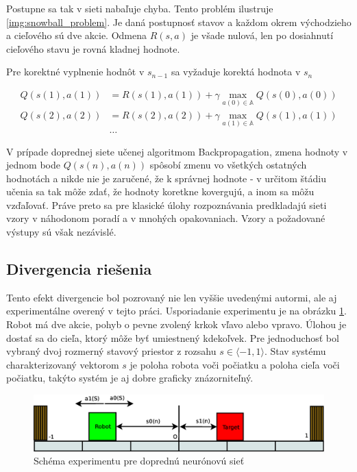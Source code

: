 Postupne sa tak v sieti nabaľuje chyba. Tento problém ilustruje \ref{img:snowball_problem}.
Je daná postupnosť stavov a každom okrem východzieho a cieľového sú dve akcie.
Odmena $R(s,a)$ je všade nulová, len po dosiahnutí cieľového stavu je rovná kladnej hodnote.

Pre korektné vyplnenie hodnôt v $s_{n-1}$ sa vyžaduje korektá hodnota v $s_{n}$

\begin{align*}
    Q(s(1),a(1)) &= R(s(1),a(1)) + \gamma \max_{a(0) \in \mathbb{A}} Q(s(0), a(0)) \\
    Q(s(2),a(2)) &= R(s(2),a(2)) + \gamma \max_{a(1) \in \mathbb{A}} Q(s(1), a(1)) \\
    & \dots
\end{align*}

V prípade doprednej siete učenej algoritmom Backpropagation, zmena hodnoty v jednom bode $Q(s(n),a(n))$ spôsobí
zmenu vo všetkých ostatných hodnotách a nikde nie je zaručené, že k správnej hodnote -
v určitom štádiu učenia sa tak môže zdať, že hodnoty koretkne kovergujú, a inom
sa môžu vzďaľovať. Práve preto sa pre klasické úlohy rozpoznávania predkladajú sieti vzory
v náhodonom poradí a v mnohých opakovaniach. Vzory a požadované výstupy sú však nezávislé.

\subsection{Divergencia riešenia}

Tento efekt divergencie bol pozrovaný nie len vyššie uvedenými autormi, ale aj experimentálne
overený v tejto práci. Usporiadanie experimentu je na obrázku \ref{img:1D_experiment_schem}.
Robot má dve akcie, pohyb o pevne zvolený krkok vľavo alebo vpravo. Úlohou je dostať sa
do cieľa, ktorý môže byť umiestnený kdekoľvek. Pre jednoduchosť bol vybraný dvoj rozmerný stavový priestor
z rozsahu $s \in \langle -1, 1 \rangle$. Stav systému charakterizovaný vektorom $s$ je
poloha robota voči počiatku a poloha cieľa voči počiatku, takýto systém je aj dobre graficky znázorniteľný.

\begin{figure}[!htb]
\center
\includegraphics[scale=.3]{../diagrams/1D_robot_diagram.eps}
\caption{Schéma experimentu pre doprednú neurónovú sieť}
\label{img:1D_experiment_schem}
\end{figure}

